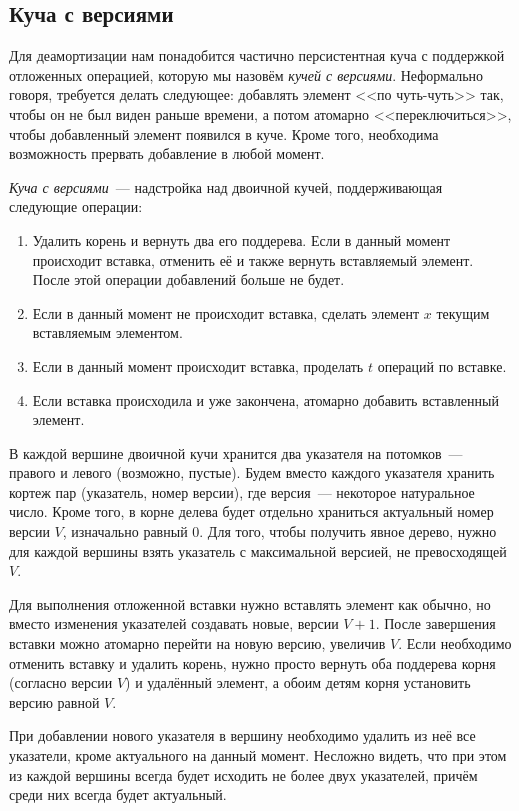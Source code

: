 \subsection{Куча с версиями}
Для деамортизации нам понадобится частично персистентная куча с поддержкой
отложенных операцией, которую мы назовём \emph{кучей с версиями}.
Неформально говоря, требуется делать следующее: добавлять элемент <<по чуть-чуть>>
так, чтобы он не был виден раньше времени, а потом атомарно <<переключиться>>,
чтобы добавленный элемент появился в куче. Кроме того, необходима возможность
прервать добавление в любой момент.

\begin{definition}
\emph{Куча с версиями}~--- надстройка над двоичной кучей,
поддерживающая следующие операции:
\begin{enumerate}
\item Удалить корень и вернуть два его поддерева. Если в данный момент происходит
    вставка, отменить её и также вернуть вставляемый элемент. После этой операции
    добавлений больше не будет.
\item Если в данный момент не происходит вставка, сделать элемент $x$
    текущим вставляемым элементом.
\item Если в данный момент происходит вставка, проделать $t$ операций по вставке.
\item Если вставка происходила и уже закончена, атомарно добавить вставленный элемент.
\end{enumerate}
\end{definition}

В каждой вершине двоичной кучи хранится два указателя на потомков~--- правого
и левого (возможно, пустые). Будем вместо каждого указателя хранить кортеж
пар (указатель, номер версии), где версия~--- некоторое натуральное число.
Кроме того, в корне делева будет отдельно храниться актуальный номер версии $V$,
изначально равный $0$.
Для того, чтобы получить явное дерево, нужно для каждой вершины взять
указатель с максимальной версией, не превосходящей $V$.

Для выполнения отложенной вставки нужно вставлять элемент как обычно, но вместо
изменения указателей создавать новые, версии $V+1$. После завершения вставки
можно атомарно перейти на новую версию, увеличив $V$. Если необходимо отменить
вставку и удалить корень, нужно просто вернуть оба поддерева корня (согласно версии
$V$) и удалённый элемент, а обоим детям корня установить версию равной $V$.

При добавлении нового указателя в вершину необходимо удалить из неё все указатели,
кроме актуального на данный момент. Несложно видеть, что при этом из каждой
вершины всегда будет исходить не более двух указателей, причём среди них
всегда будет актуальный.
